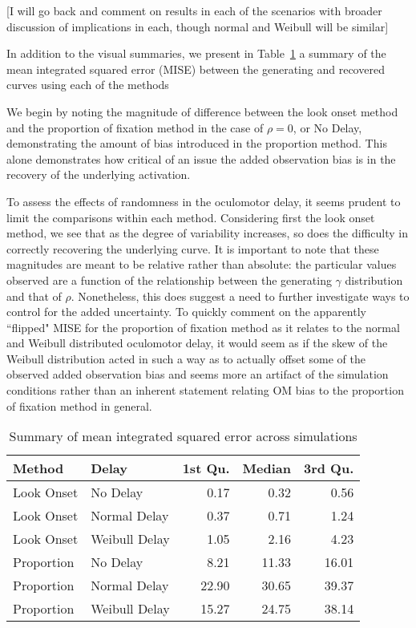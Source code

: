 [I will go back and comment on results in each of the scenarios with broader discussion of implications in each, though normal and Weibull will be similar]

In addition to the visual summaries, we present in Table~\ref{tab:mise_sims} a summary of the mean integrated squared error (MISE) between the generating and recovered curves using each of the methods

We begin by noting the  magnitude of difference between the look onset method and the proportion of fixation method in the case of $\rho = 0$, or No Delay, demonstrating the amount of bias introduced in the proportion method. This alone demonstrates how critical of an issue the added observation bias is in the recovery of the underlying activation.

To assess the effects of randomness in the oculomotor delay, it seems prudent to limit the comparisons within each method. Considering first the look onset method, we see that as the degree of variability increases, so does the difficulty in correctly recovering the underlying curve. It is important to note that these magnitudes are meant to be relative rather than absolute: the particular values observed are a function of the relationship between the generating $\gamma$ distribution and that of $\rho$. Nonetheless, this does suggest a need to further investigate ways to control for the added uncertainty. To quickly comment on the apparently ``flipped" MISE for the proportion of fixation method as it relates to the normal and Weibull distributed oculomotor delay, it would seem as if the skew of the Weibull distribution acted in such a way as to actually offset some of the observed added observation bias and seems more an artifact of the simulation conditions rather than an inherent statement relating OM bias to the proportion of fixation method in general.

\begin{table}[H]
\centering
\begin{tabular}{llrrr}
  \hline
Method & Delay & 1st Qu. & Median & 3rd Qu. \\ 
  \hline
Look Onset & No Delay & 0.17 & 0.32 & 0.56 \\ 
  Look Onset & Normal Delay & 0.37 & 0.71 & 1.24 \\ 
  Look Onset & Weibull Delay & 1.05 & 2.16 & 4.23 \\ 
  Proportion & No Delay & 8.21 & 11.33 & 16.01 \\ 
  Proportion & Normal Delay & 22.90 & 30.65 & 39.37 \\ 
  Proportion & Weibull Delay & 15.27 & 24.75 & 38.14 \\ 
   \hline
\end{tabular}
\caption{Summary of mean integrated squared error across simulations}
\label{tab:mise_sims}
\end{table}

